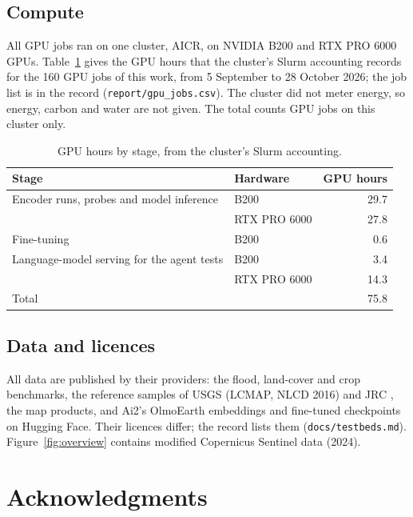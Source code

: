 \documentclass[11pt,a4paper]{article}
\newcommand{\code}[1]{\texttt{#1}}
\begin{document}
\subsection{Compute}
\label{sec:compute}
All GPU jobs ran on one cluster, AICR, on NVIDIA B200 and RTX PRO 6000 GPUs. Table~\ref{tab:compute} gives the GPU
hours that the cluster's Slurm accounting records for the 160 GPU jobs of this work, from 5 September to 28 October
2026; the job list is in the record (\code{report/gpu\_jobs.csv}). The cluster did not meter energy, so energy,
carbon and water are not given. The total counts GPU jobs on this cluster only.

\begin{table}[h]
\centering
\small
\caption{GPU hours by stage, from the cluster's Slurm accounting.}
\label{tab:compute}
\begin{tabular}{@{}llr@{}}
\toprule
Stage & Hardware & GPU hours \\
\midrule
Encoder runs, probes and model inference & B200 & 29.7 \\
 & RTX PRO 6000 & 27.8 \\
Fine-tuning & B200 & 0.6 \\
Language-model serving for the agent tests & B200 & 3.4 \\
 & RTX PRO 6000 & 14.3 \\
\midrule
Total & & 75.8 \\
\bottomrule
\end{tabular}
\end{table}

\subsection{Data and licences}
\label{sec:avail}

\begin{sloppypar}
All data are published by their providers: the flood, land-cover and crop benchmarks, the reference samples of USGS
(LCMAP, NLCD 2016) and JRC \citep[GFC2020, CC BY 4.0;][]{colditz2025data}, the map products, and Ai2's OlmoEarth
embeddings and fine-tuned checkpoints on Hugging Face. Their licences differ; the record lists them
(\code{docs/testbeds.md}). Figure~\ref{fig:overview} contains modified Copernicus Sentinel data (2024).
\end{sloppypar}

\section*{Acknowledgments}
\end{document}
